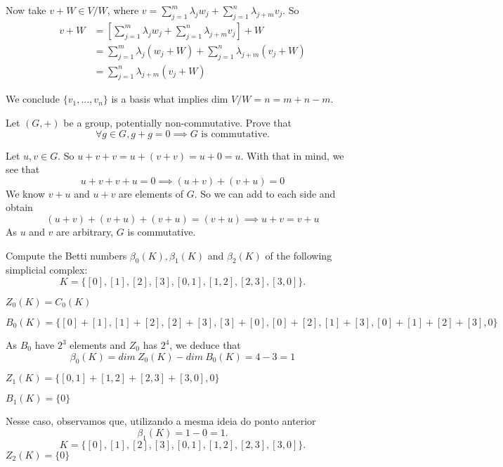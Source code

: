 Now take $v + W \in V/W$, where $v = \sum_{j=1}^m \lambda_j w_j + \sum_{j=1}^n
\lambda_{j+m} v_j$. So 
\begin{equation*}
    \begin{split}
        v + W &= \left[\sum_{j=1}^m \lambda_j w_j + \sum_{j=1}^n
        \lambda_{j+m} v_j\right] + W \\
        &= \sum_{j=1}^m \lambda_j (w_j + W) + \sum_{j=1}^n
        \lambda_{j+m} (v_j+ W) \\
        &= \sum_{j=1}^n
        \lambda_{j+m} (v_j+ W) 
    \end{split}
\end{equation*}

We conclude $\{v_1,
..., v_{n}\}$ is a basis what implies $\text{dim } V/W = n = m + n - m$. 

\noindent\linia

\begin{exercise}
    Let $(G, +)$ be a group, potentially non-commutative. Prove that
    $$\forall g \in G, g + g = 0 \implies G \text{ is commutative.}$$
\end{exercise}

Let $u,v \in G$. So $u + v + v = u + (v + v) = u + 0 = u$. With that in mind,
we see that 
$$
u + v + v + u = 0 \implies (u + v) + (v + u) = 0 
$$
We know $v + u$ and $u + v$ are elements of $G$. So we can add to each side
and obtain 
$$
(u + v) + (v + u) + (v + u) = (v + u) \implies u + v = v + u
$$
As $u$ and $v$ are arbitrary, $G$ is commutative. 

\noindent\linia

\begin{exercise}
    Compute the Betti numbers $\beta_0(K), \beta_1(K)$ and $\beta_2(K)$ of the
    following simplicial complex:
    $$
    K = \{[0], [1], [2], [3], [0, 1], [1, 2], [2, 3], [3, 0]\}.
    $$
\end{exercise}

$Z_0(K) = C_0(K)$

$B_0(K) = \{[0] + [1], [1] + [2], [2] + [3], [3] + [0], [0] + [2], [1] + [3],
[0] + [1] + [2] + [3], 0\}$

As $B_0$ have $2^3$ elements and $Z_0$ has $2^4$, we deduce that 
$$\beta_0(K) = dim ~Z_0(K) - dim ~B_0(K) = 4 - 3 = 1$$

$Z_1(K) = \{[0,1] + [1,2] + [2,3] + [3,0], 0\}$

$B_1(K) = \{0\}$

Nesse caso, observamos que, utilizando a mesma ideia do ponto anterior 
$$\beta_1(K) = 1 - 0 = 1.$$
$$
K = \{[0], [1], [2], [3], [0, 1], [1, 2], [2, 3], [3, 0]\}.
$$
$Z_2(K) = \{0\}$

